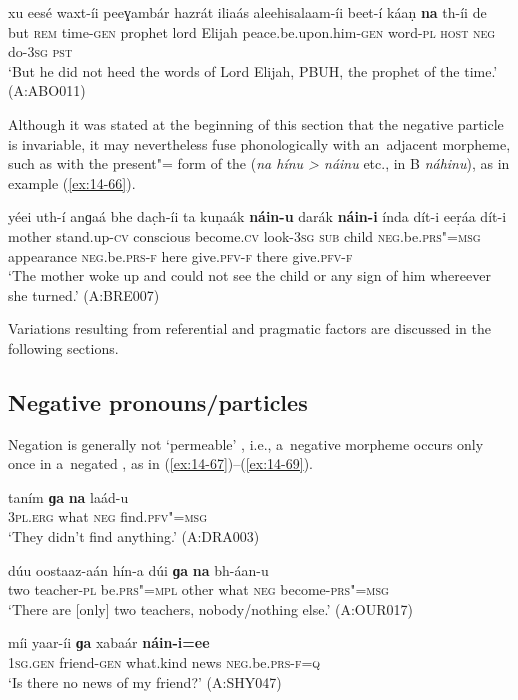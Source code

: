 \ex
\label{ex:14-65}
\gll xu eesé waxt-íi peeɣambár hazrát iliaás aleehisalaam-íi beet-í káaṇ \textbf{na} th-íi de \\
but \textsc{rem} time-\textsc{gen} prophet lord  Elijah peace.be.upon.him-\textsc{gen} word-\textsc{pl} \textsc{host} \textsc{neg} do-\textsc{3sg} \textsc{pst} \\
\glt `But he did not heed the words of Lord Elijah, PBUH, the prophet of the time.' (A:ABO011)
\z

Although it was stated at the beginning of this section that the negative particle is invariable, it may nevertheless fuse phonologically with an~adjacent morpheme, such as with the present"= form of the  (\textit{na hínu {\textgreater} náinu} etc., in B \textit{náhinu}), as in example (\ref{ex:14-66}).

\ea
\label{ex:14-66}
\gll yéei uth-í anɡaá bhe dac̣h-íi ta kuṇaák \textbf{náin-u} darák \textbf{náin-i} índa dít-i eeṛáa dít-i \\
mother stand.up-\textsc{cv} conscious become.\textsc{cv} look-\textsc{3sg}  \textsc{sub} child \textsc{neg.}be.\textsc{prs"=msg} appearance \textsc{neg.}be.\textsc{prs-f}  here give.\textsc{pfv-f} there give.\textsc{pfv-f} \\
\glt `The mother woke up and could not see the child or any sign of him whereever she turned.' (A:BRE007)
\z

Variations resulting from referential and pragmatic factors are discussed in the following sections.


\subsection{Negative pronouns/particles}
\label{subsec:14-3-2}

Negation is generally not `permeable' \citep[563]{ramat2006}, i.e., a~negative morpheme occurs only once in a~negated , as in (\ref{ex:14-67})--(\ref{ex:14-69}).

\begin{exe}
\ex
\label{ex:14-67}
\gll taním \textbf{ɡa} \textbf{na} laád-u \\
\textsc{3pl.erg} what \textsc{neg} find.\textsc{pfv"=msg}  \\
\glt `They didn't find anything.' (A:DRA003)

\ex
\label{ex:14-68}
\gll dúu oostaaz-aán hín-a dúi \textbf{ɡa} \textbf{na}  bh-áan-u \\
two teacher-\textsc{pl} be.\textsc{prs"=mpl} other what \textsc{neg}  become-\textsc{prs"=msg} \\
\glt `There are [only] two teachers, nobody/nothing else.' (A:OUR017)

\ex
\label{ex:14-69}
\gll míi yaar-íi \textbf{ɡa} xabaár \textbf{náin-i=ee}\\
\textsc{1sg.gen} friend-\textsc{gen} what.kind news \textsc{neg}.be.\textsc{prs-f=q}\\
\glt `Is there no news of my friend?' (A:SHY047)
\end{exe}

